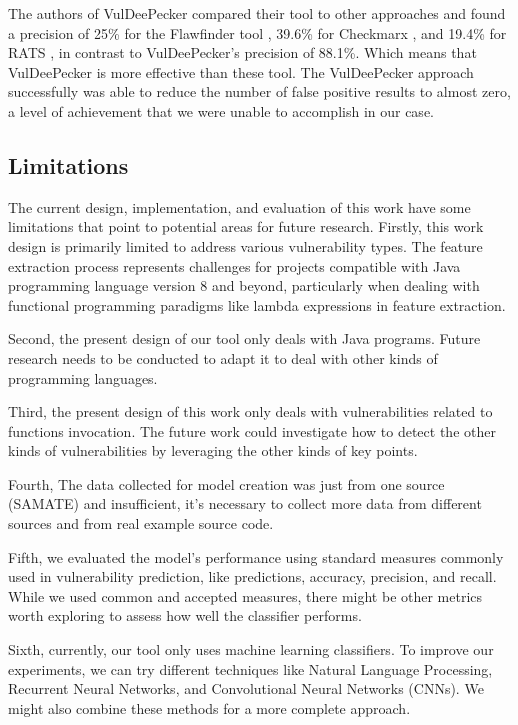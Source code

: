 \documentclass[journal,a4paper]{IEEEtran}
\begin{document}
The authors of VulDeePecker compared their tool to other approaches and found a precision of 25\% for the Flawfinder  tool \cite{Flawfinder_}, 39.6\% for Checkmarx \cite{Checkmarx_}, and 19.4\% for RATS \cite{RATS_}, in contrast to VulDeePecker's precision of 88.1\%. Which means that VulDeePecker is more effective than these tool. The VulDeePecker approach successfully was able to reduce the number of false positive results to almost zero, a level of achievement that we were unable to accomplish in our case.

\subsection{Limitations}

The current design, implementation, and evaluation of this work have some limitations that point to potential areas for future research. Firstly, this work design is primarily limited to address various vulnerability types. The feature extraction process represents challenges for projects compatible with Java programming language version 8 and beyond, particularly when dealing with functional programming paradigms like lambda expressions in feature extraction.

Second, the present design of our tool only deals with Java programs. Future research needs to be conducted to adapt it to deal with other kinds of programming languages.

Third, the present design of this work only deals with vulnerabilities related to functions invocation. The future work could investigate how to detect the other kinds of vulnerabilities by leveraging the other kinds of key points.

Fourth, The data collected for model creation was just from one source (SAMATE) and  insufficient, it's necessary to collect more data from different sources and from real example source code.

Fifth, we evaluated the model's performance using standard measures commonly used in vulnerability prediction, like predictions, accuracy, precision, and recall. While we used common and accepted measures, there might be other metrics worth exploring to assess how well the classifier performs.

Sixth, currently, our tool only uses machine learning classifiers. To improve our experiments, we can try different techniques like Natural Language Processing, Recurrent Neural Networks, and Convolutional Neural Networks (CNNs). We might also combine these methods for a more complete approach.
\end{document}
